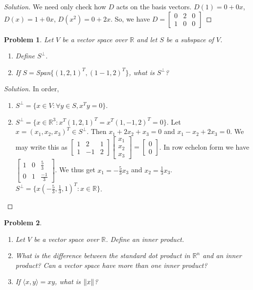 \documentclass[oneside]{book}
\theoremstyle{mystyle}
\newtheorem{problem}{Problem}[section]
\DeclarePairedDelimiter\norm{\lVert}{\rVert}
\begin{document}
\begin{proof}[Solution]
We need only check how $D$ acts on the basis vectors. $D(1) = 0+0x$, $D(x) = 1+0x$, $D(x^2) = 0+2x$. So, we have $D = \begin{bmatrix} 0 & 2 & 0 \\ 1 & 0 & 0 \end{bmatrix}$
\end{proof}
\begin{problem}
Let $V$ be a vector space over $\mathbb{R}$ and let $S$ be a subspace of $V$.
\begin{enumerate}
    \item Define $S^{\perp}$.
    \item If $S = $Span$\{ (1,2,1)^T, (1-1,2)^T\}$, what is $S^{\perp}$?
\end{enumerate}
\end{problem}
\begin{proof}[Solution]
In order,
\begin{enumerate}
    \item $S^{\perp} = \{x\in V: \forall y\in S, x^T y = 0\}$.
    \item $S^{\perp} = \{x\in \mathbb{R}^3: x^T (1,2,1)^T = x^T(1,-1,2)^T = 0\}$. Let $x = (x_1,x_2,x_3)^T \in S^{\perp}$. Then $x_1+2x_2+x_3=0$ and $x_1-x_2+2x_3 = 0$. We may write this as $\begin{bmatrix} 1 & 2 & 1 \\ 1 & -1 & 2 \end{bmatrix} \begin{bmatrix} x_1 \\ x_2\\ x_3 \end{bmatrix} = \begin{bmatrix} 0 \\ 0 \end{bmatrix}$. In row echelon form we have $\begin{bmatrix} 1 & 0 & \frac{5}{3} \\ 0 & 1 & \frac{-1}{3} \end{bmatrix}$. We thus get $x_1 = - \frac{5}{3}x_3$ and $x_2 = \frac{1}{3} x_3$.  $S^{\perp} = \{x(-\frac{5}{3}, \frac{1}{3}, 1)^T: x\in \mathbb{R}\}$.
\end{enumerate}
\end{proof}
\begin{problem}
\begin{enumerate}
    \item Let $V$ be a vector space over $\mathbb{R}$. Define an inner product.
    \item What is the difference between the standard dot product in $\mathbb{R}^n$ and an inner product? Can a vector space have more than one inner product?
    \item If $\langle x,y \rangle = xy$, what is $\norm{x}$?
\end{enumerate}
\end{problem}
\end{document}
